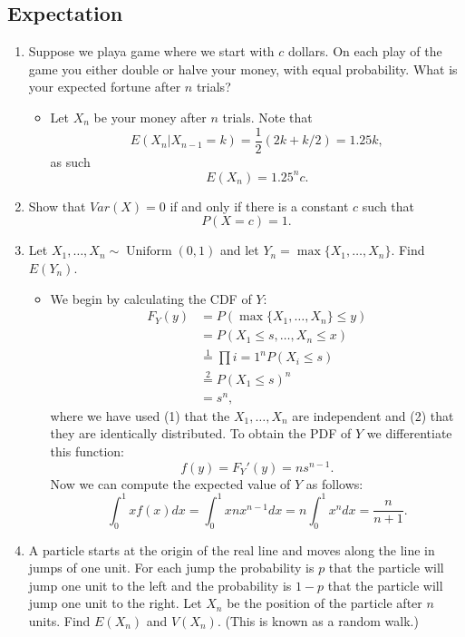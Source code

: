 \documentclass{article}
\begin{document}
\subsection{Expectation}
\begin{enumerate}
	\item Suppose we playa game where we start with $c$ dollars. On each play of the game you either double or halve your money, with equal probability. What is your expected fortune after $n$ trials?
		\begin{itemize}
			\item Let $X_n$ be your money after $n$ trials. Note that
			$$
			E(X_n|X_{n - 1} = k) = \frac{1}{2}(2k + k / 2) = 1.25k,
			$$
			as such
			$$
			E(X_n) = 1.25^n c.
			$$
		\end{itemize}
	\item Show that $Var(X) = 0$ if and only if there is a constant $c$ such that
	$$
	P(X = c) = 1.
	$$
	\item Let $X_1, \dots, X_n \sim \operatorname{Uniform}(0, 1)$ and let $Y_n = \max \{X_1, \dots, X_n\}$. Find $E(Y_n)$.
		\begin{itemize}
			\item We begin by calculating the CDF of $Y$:
			$$
			\begin{aligned}
				F_Y(y) &= P(\max\{X_1, \dots, X_n\} \leq y) \\
				&= P(X_1 \leq s, \dots, X_n \leq x) \\
				&\overset{1}{=} \prod{i = 1}^n P(X_i \leq s) \\
				&\overset{2}{=} P(X_1 \leq s)^n \\
				&= s^n,
			\end{aligned}
			$$
			where we have used (1) that the $X_1, \dots, X_n$ are independent and (2) that they are identically distributed. To obtain the PDF of $Y$ we differentiate this function:
			$$
			f(y) = F_Y'(y) = n s^{n - 1}.
			$$
			Now we can compute the expected value of $Y$ as follows:
			$$
			\int_0^1 x f(x) dx = \int_0^1 x n x^{n - 1} dx = n \int_0^1 x^n dx = \frac{n}{n + 1}. 
			$$
		\end{itemize}
	\item A particle starts at the origin of the real line and moves along the line in jumps of one unit. For each jump the probability is $p$ that the particle will jump one unit to the left and the probability is $1-p$ that the particle
	will jump one unit to the right. Let $X_n$ be the position of the particle after $n$ units. Find $E(X_n)$ and $V(X_n)$. (This is known as a random walk.)

\end{enumerate}
\end{document}
